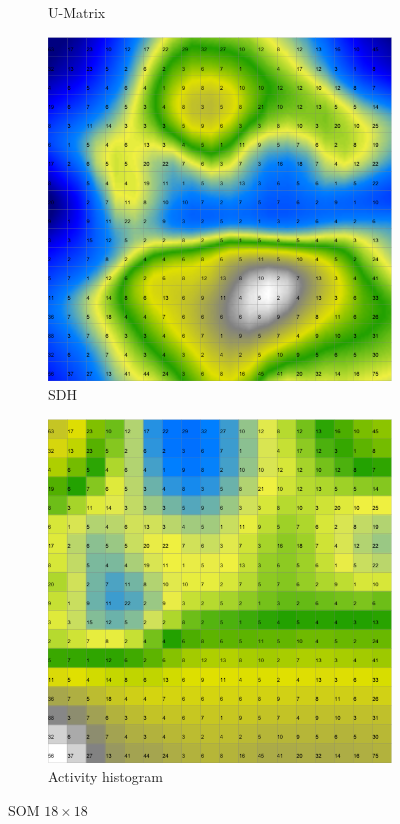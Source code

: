 \documentclass{acm_proc_article-sp}
\begin{document}
\begin{figure}
\begin{subfigure}[b]{0.45\linewidth}
    \caption{U-Matrix}
    \label{fig:wine-mid-u-matrix}
\end{subfigure}
\begin{subfigure}[b]{0.45\linewidth}
    \includegraphics[width=\linewidth]{img/wine-mid-smoothed-data-histogram}
    \caption{SDH}
    \label{fig:wine-mid-smoothed-data-histogram}
\end{subfigure}
\begin{subfigure}[b]{0.45\linewidth}
    \includegraphics[width=\linewidth]{img/wine-mid-activity-histogram}
    \caption{Activity histogram}
    \label{fig:wine-mid-activity-histogram}
\end{subfigure}
\caption{SOM $18\times18$}
\end{figure}
\end{document}
